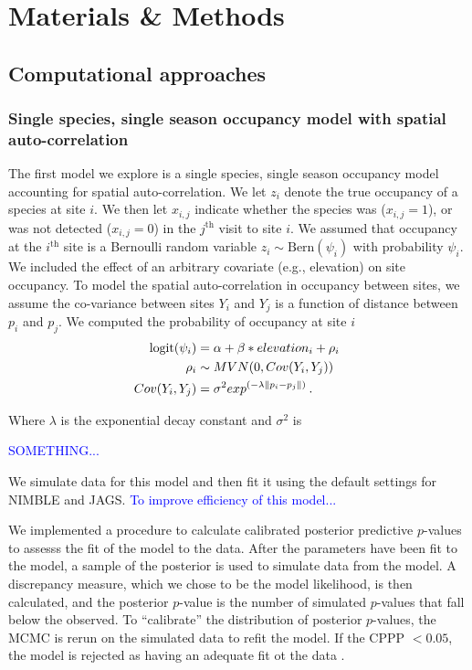 \documentclass[12pt]{article}
\newcommand{\flagged}[1] {
  \textcolor{blue}{#1}
}
\begin{document}
\section*{Materials \& Methods}
\label{sec:methods}
\subsection*{Computational approaches}

\subsubsection*{Single species, single season occupancy model with
  spatial auto-correlation}
The first model we explore is a single species, single season
occupancy model accounting for spatial auto-correlation. We let
$z_{i}$ denote the true occupancy of a species at site $i$.  We then
let $x_{i,j}$ indicate whether the species was ($x_{i,j}=1$), or was
not detected ($x_{i,j}=0$) in the $j^{\mathrm{th}}$ visit to site $i$.
We assumed that occupancy at the $i^{\mathrm{th}}$ site is a Bernoulli
random variable $z_{i} \sim \mathrm{Bern}(\psi_{i})$ with probability
$\psi_{i}$.  We included the effect of an arbitrary covariate (e.g.,
elevation) on site occupancy. To model the spatial auto-correlation in
occupancy between sites, we assume the co-variance between sites $Y_i$
and $Y_j$ is a function of distance between $p_i$ and $p_j$. We
computed the probability of occupancy at site $i$
%
\begin{equation}
  \begin{split}
    \label{eq:spatial}
    \mathrm{logit}(\psi_{i}) &=
    \alpha + \beta*elevation_i + \rho_i\hspace{0.2em}\\
    \rho_i &\sim MVN(0, {Cov}(Y_i,Y_j)) \hspace{0.2em}\\
    {Cov} (Y_i,Y_j) &= \sigma^2exp^{(-\lambda\|p_i-p_j\|)} \hspace{0.2em}.\\
  \end{split}
\end{equation}
%

Where $\lambda$ is the exponential decay constant and $\sigma^2$ is
\flagged{SOMETHING...}

We simulate data for this model and then fit it using the default
settings for NIMBLE and JAGS. \flagged{To improve efficiency of this
  model...}

We implemented a procedure to calculate calibrated posterior
predictive $p$-values \citep[CPPP, ][]{hjort-etal-06} to assesss the
fit of the model to the data. After the parameters have been fit to
the model, a sample of the posterior is used to simulate data from the
model. A discrepancy measure, which we chose to be the model
likelihood, is then calculated, and the posterior $p$-value is the
number of simulated $p$-values that fall below the observed. To
``calibrate'' the distribution of posterior $p$-values, the MCMC is
rerun on the simulated data to refit the model. If the CPPP $< 0.05$,
the model is rejected as having an adequate fit ot the data
\citep{hjort-etal-06}.
\end{document}
